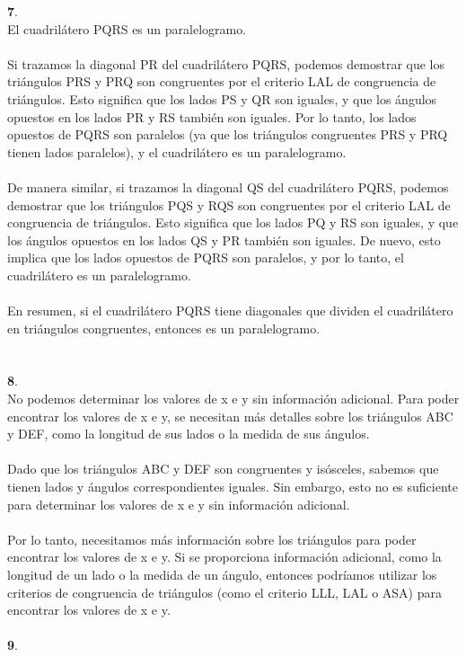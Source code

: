 \documentclass{article}
\begin{document}
{\textbf 7. }\\
El cuadrilátero PQRS es un paralelogramo.\\
\\
Si trazamos la diagonal PR del cuadrilátero PQRS, podemos demostrar que los triángulos PRS y PRQ son congruentes por el criterio LAL de congruencia de triángulos. Esto significa que los lados PS y QR son iguales, y que los ángulos opuestos en los lados PR y RS también son iguales. Por lo tanto, los lados opuestos de PQRS son paralelos (ya que los triángulos congruentes PRS y PRQ tienen lados paralelos), y el cuadrilátero es un paralelogramo.\\
\\
De manera similar, si trazamos la diagonal QS del cuadrilátero PQRS, podemos demostrar que los triángulos PQS y RQS son congruentes por el criterio LAL de congruencia de triángulos. Esto significa que los lados PQ y RS son iguales, y que los ángulos opuestos en los lados QS y PR también son iguales. De nuevo, esto implica que los lados opuestos de PQRS son paralelos, y por lo tanto, el cuadrilátero es un paralelogramo.\\
\\
En resumen, si el cuadrilátero PQRS tiene diagonales que dividen el cuadrilátero en triángulos congruentes, entonces es un paralelogramo.\\
\\
\\
{\textbf 8. }\\
No podemos determinar los valores de x e y sin información adicional. Para poder encontrar los valores de x e y, se necesitan más detalles sobre los triángulos ABC y DEF, como la longitud de sus lados o la medida de sus ángulos.\\
\\
Dado que los triángulos ABC y DEF son congruentes y isósceles, sabemos que tienen lados y ángulos correspondientes iguales. Sin embargo, esto no es suficiente para determinar los valores de x e y sin información adicional.\\
\\
Por lo tanto, necesitamos más información sobre los triángulos para poder encontrar los valores de x e y. Si se proporciona información adicional, como la longitud de un lado o la medida de un ángulo, entonces podríamos utilizar los criterios de congruencia de triángulos (como el criterio LLL, LAL o ASA) para encontrar los valores de x e y.\\
\\
{\textbf 9. }\\
\end{document}

